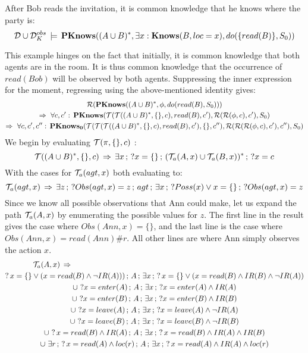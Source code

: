 \begin{example}
After Bob reads the invitation, it is common knowledge that he knows
where the party is:\[
\mathcal{D}\cup\mathcal{D}_{K}^{obs}\,\models\,\mathbf{PKnows}((A\cup B)^{*},\exists x:\mathbf{Knows}(B,loc=x),do(\{read(B)\},S_{0}))\]

\end{example}
This example hinges on the fact that initially, it is common knowledge
that both agents are in the room. It is thus common knowledge that
the occurrence of $read(Bob)$ will be observed by both agents. Suppressing
the inner expression for the moment, regressing using the above-mentioned
identity gives:\begin{multline*}
\mathcal{R}(\mathbf{PKnows}((A\cup B)^{*},\phi,do(read(B),S_{0})))\\
\Rightarrow\,\,\forall c,c':\,\mathbf{PKnows}(\mathcal{T}(\mathcal{T}((A\cup B)^{*},\{\},c),read(B),c'),\mathcal{R}(\mathcal{R}(\phi,c),c'),S_{0})\\
\Rightarrow\,\,\forall c,c',c'':\,\mathbf{PKnows_{0}}(\mathcal{T}(\mathcal{T}(\mathcal{T}((A\cup B)^{*},\{\},c),read(B),c'),\{\},c''),\mathcal{R}(\mathcal{R}(\mathcal{R}(\phi,c),c'),c''),S_{0})\end{multline*}
We begin by evaluating $\mathcal{T}(\pi,\{\},c)$ :\[
\mathcal{T}((A\cup B)^{*},\{\},c)\,\Rightarrow\,\exists x\,;\,?x=\{\}\,;\,(\mathcal{T}_{a}(A,x)\cup\mathcal{T}_{a}(B,x))^{*}\,;\,?x=c\]
With the cases for $\mathcal{T}_{a}(agt,x)$ both evaluating to:\[
\mathcal{T}_{a}(agt,x)\,\Rightarrow\,\exists z\,;\,?Obs(agt,x)=z\,;\, agt\,;\,\exists x\,;\,?Poss(x)\vee x=\{\}\,;\,?Obs(agt,x)=z\]
Since we know all possible observations that Ann could make, let us
expand the path $\mathcal{T}_{a}(A,x)$ by enumerating the possible values for
$z$. The first line in the result gives the case where $Obs(Ann,x)=\{\}$,
and the last line is the case where $Obs(Ann,x)=read(Ann)\#r$. All
other lines are where Ann simply observes the action $x$. \begin{gather*}
\mathcal{T}_{a}(A,x)\,\Rightarrow\,\,\,\,\,\,\,\,\,\,\,\,\,\,\,\,\,\,\,\,\,\,\,\,\,\,\,\,\,\,\,\,\,\,\,\,\,\,\,\,\,\,\,\,\,\,\,\,\,\,\,\,\,\,\,\,\,\,\,\,\,\,\,\,\,\,\,\,\,\,\,\,\,\,\,\,\,\,\,\,\,\,\,\,\,\,\,\,\,\,\,\,\,\,\,\,\,\,\,\,\,\,\,\,\,\,\,\,\,\,\,\,\,\,\,\,\,\,\,\,\,\,\,\,\,\,\,\,\,\,\,\,\,\,\,\,\,\,\,\,\,\,\,\,\,\,\,\,\,\,\,\,\,\,\,\,\,\,\,\,\,\,\,\\
?\, x=\{\}\vee(x=read(B)\wedge\neg IR(A)))\,;\, A\,;\,\exists x\,;\,?\, x=\{\}\vee(x=read(B)\wedge IR(B)\wedge\neg IR(A))\\
\cup\,\,?x=enter(A)\,;\, A\,;\,\exists x\,;\,?x=enter(A)\wedge IR(A)\\
\cup\,\,?x=enter(B)\,;\, A\,;\,\exists x\,;\,?x=enter(B)\wedge IR(B)\\
\cup\,\,?x=leave(A)\,;\, A\,;\,\exists x\,;\,?x=leave(A)\wedge\neg IR(A)\\
\cup\,\,?x=leave(B)\,;\, A\,;\,\exists x\,;\,?x=leave(B)\wedge\neg IR(B)\\
\cup\,\,?\, x=read(B)\wedge IR(A)\,;\, A\,;\,\exists x\,;\,?\, x=read(B)\wedge IR(A)\wedge IR(B)\\
\cup\,\,\exists r\,;\,?\, x=read(A)\wedge loc(r)\,;\, A\,;\,\exists x\,;\,?\, x=read(A)\wedge IR(A)\wedge loc(r)\end{gather*}
